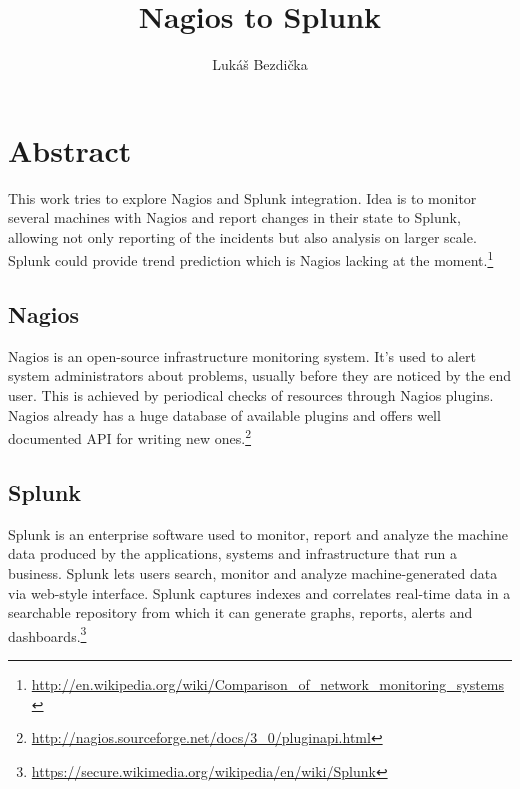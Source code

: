 \documentclass[10pt,a4paper,final]{report}
\author{Lukáš Bezdička}
\title{Nagios to Splunk}
\begin{document}
\setcounter{page}{1}

\chapter*{Abstract}
This work tries to explore Nagios and Splunk integration. Idea is to monitor several machines with Nagios and report changes in their state to Splunk, allowing not only reporting of the incidents but also analysis on larger scale. Splunk could provide trend prediction which is Nagios lacking at the moment.\footnote{\url{http://en.wikipedia.org/wiki/Comparison\_of\_network\_monitoring\_systems}}
\section*{Nagios}
Nagios is an open-source infrastructure monitoring system. It's used to alert system administrators about problems, usually before they are noticed by the end user. This is achieved by periodical checks of resources through Nagios plugins. Nagios already has a huge database of available plugins and offers well documented API for writing new ones.\footnote{\url{http://nagios.sourceforge.net/docs/3\_0/pluginapi.html}}
\section*{Splunk}
Splunk is an enterprise software used to monitor, report and analyze the machine data produced by the applications, systems and infrastructure that run a business. Splunk lets users search, monitor and analyze machine-generated data via web-style interface. Splunk captures indexes and correlates real-time data in a searchable repository from which it can generate graphs, reports, alerts and dashboards.\footnote{\url{https://secure.wikimedia.org/wikipedia/en/wiki/Splunk}}
\newpage

\setcounter{tocdepth}{3}
\setcounter{page}{1}

\tableofcontents
\end{document}
